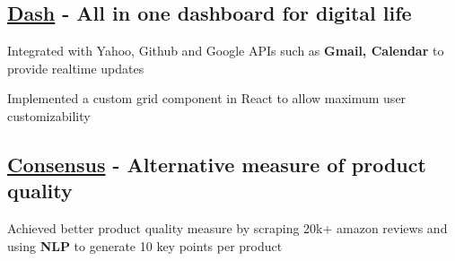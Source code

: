 

\subsection{\href{https://devpost.com/software/dash-um2zil}{Dash} - All in one dashboard for digital life}
\begin{zitemize}
    \item Integrated with Yahoo, Github and Google APIs such as \textbf{Gmail, Calendar} to provide realtime updates
    \item Implemented a custom grid component in React to allow maximum user customizability
\end{zitemize}

\vspace{0.3cm}\subsection{\href{https://devpost.com/software/consensus-qlc9n6}{Consensus} - Alternative measure of product quality}
\begin{zitemize}
    \item Achieved better product quality measure by scraping 20k+ amazon reviews and using \textbf{NLP} to generate 10 key points per product
\end{zitemize}
